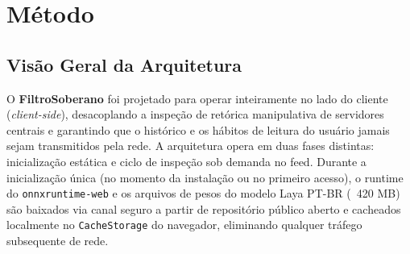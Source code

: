\documentclass[runningheads]{llncs}
\begin{document}
\begin{table}[t]
\centering
\caption{Matriz comparativa com definições operacionais explícitas.}\label{tab:comparativo}
\end{table}

\section{Método}

\subsection{Visão Geral da Arquitetura}

O \textbf{FiltroSoberano} foi projetado para operar inteiramente no lado do cliente (\textit{client-side}), desacoplando a inspeção de retórica manipulativa de servidores centrais e garantindo que o histórico e os hábitos de leitura do usuário jamais sejam transmitidos pela rede. A arquitetura opera em duas fases distintas: inicialização estática e ciclo de inspeção sob demanda no feed. Durante a inicialização única (no momento da instalação ou no primeiro acesso), o runtime do \texttt{onnxruntime-web} e os arquivos de pesos do modelo Laya PT-BR (~420 MB) são baixados via canal seguro a partir de repositório público aberto e cacheados localmente no \texttt{CacheStorage} do navegador, eliminando qualquer tráfego subsequente de rede.
\end{document}
